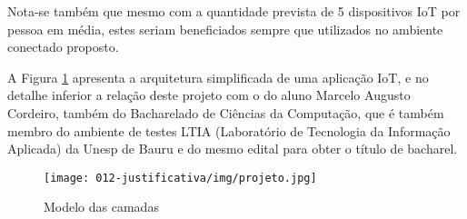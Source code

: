 Nota-se também que mesmo com a quantidade prevista de 5 dispositivos IoT por
pessoa em média, estes seriam beneficiados sempre que utilizados no ambiente
conectado proposto.

A Figura \ref{fig-projeto} apresenta a arquitetura simplificada de uma aplicação
IoT, e no detalhe inferior a relação deste projeto com o do aluno Marcelo Augusto
Cordeiro, também do Bacharelado de Ciências da Computação, que é também membro do
ambiente de testes LTIA (Laboratório de Tecnologia da Informação Aplicada) da Unesp de Bauru
e do mesmo edital para obter o título de bacharel.

\begin{figure}[htb]
	\caption{\label{fig-projeto}Modelo das camadas }
	\begin{center}
		\texttt{[image: 012-justificativa/img/projeto.jpg]}
	\end{center}
\end{figure}
